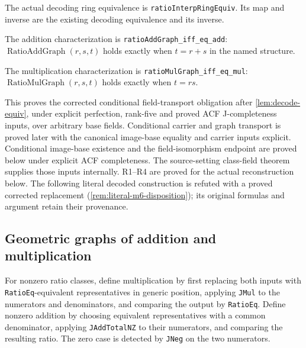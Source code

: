 \documentclass[11pt,oneside]{article}
\theoremstyle{definition}
\theoremstyle{remark}
\newcommand{\lean}[1]{\nolinkurl{#1}}
\begin{document}
The actual decoding ring equivalence is \lean{ratioInterpRingEquiv}.
Its map and inverse are the existing decoding equivalence and its inverse.

The addition characterization is \lean{ratioAddGraph_iff_eq_add}:
$\operatorname{RatioAddGraph}(r,s,t)$ holds exactly when $t=r+s$ in the named structure.

The multiplication characterization is \lean{ratioMulGraph_iff_eq_mul}:
$\operatorname{RatioMulGraph}(r,s,t)$ holds exactly when $t=rs$.

This proves the corrected conditional field-transport obligation after
\cref{lem:decode-equiv}, under explicit perfection, rank-five and proved ACF
J-completeness inputs, over arbitrary base fields. Conditional carrier and graph
transport is proved later with the canonical image-base equality and carrier inputs
explicit. Conditional image-base existence and the field-isomorphism endpoint are proved below
under explicit ACF completeness. The source-setting class-field theorem supplies
those inputs internally. R1--R4 are proved for the actual reconstruction below.
The following literal decoded construction is refuted with a proved corrected replacement
(\cref{rem:literal-m6-disposition}); its original formulas and argument retain their provenance.

\subsection{Geometric graphs of addition and multiplication}

For nonzero ratio classes, define multiplication by first replacing both inputs with
\lean{RatioEq}-equivalent representatives in generic position, applying \lean{JMul} to
the numerators and denominators, and comparing the output by \lean{RatioEq}.  Define
nonzero addition by choosing equivalent representatives with a common denominator,
applying \lean{JAddTotalNZ} to their numerators, and comparing the resulting ratio.  The zero
case is detected by \lean{JNeg} on the two numerators.
\end{document}
